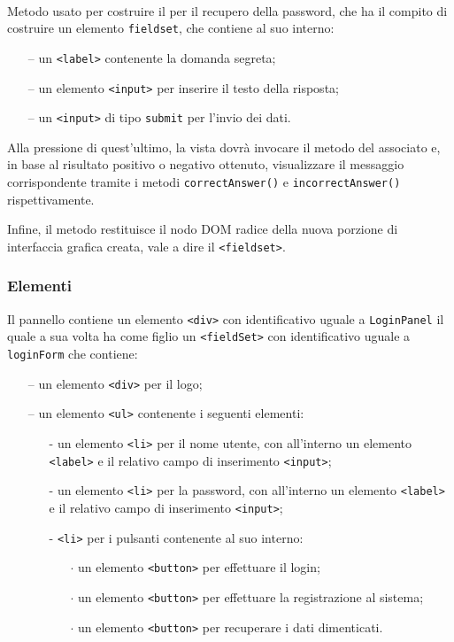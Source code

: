 \begin{description}
	\item{}\\
	Metodo usato per costruire il  per il recupero della password, che ha il compito di costruire un elemento \verb'fieldset', che contiene al suo interno:
	\begin{itemize}
	  \item[--] un \verb'<label>' contenente la domanda segreta;
	  \item[--] un elemento \verb'<input>' per inserire il testo della risposta;
	  \item[--] un \verb'<input>' di tipo \verb'submit' per l'invio dei dati.
	\end{itemize}
Alla pressione di quest'ultimo, la vista dovrà invocare il metodo  del  associato e, in base al risultato positivo o negativo ottenuto, visualizzare il messaggio corrispondente tramite i metodi \verb'correctAnswer()' e \verb'incorrectAnswer()' rispettivamente.

Infine, il metodo restituisce il nodo DOM radice della nuova porzione di interfaccia grafica creata, vale a dire il \verb'<fieldset>'.

\end{description}

\subsubsection*{Elementi}
Il pannello contiene un elemento \verb'<div>' con identificativo uguale a \verb'LoginPanel' il quale a sua volta ha come figlio un \verb'<fieldSet>' con identificativo uguale a \verb'loginForm' che contiene:
  \begin{itemize}
    \item[--] un elemento \verb'<div>' per il logo;
    \item[--] un elemento \verb'<ul>' contenente i seguenti elementi:
    \begin{itemize}
      \item[-] un elemento \verb'<li>' per il nome utente, con all'interno un elemento \verb'<label>' e il relativo campo di inserimento \verb'<input>';
      \item[-] un elemento \verb'<li>' per la password, con all'interno un elemento \verb'<label>' e il relativo campo di inserimento \verb'<input>';
      \item[-] \verb'<li>' per i pulsanti contenente al suo interno:
      \begin{itemize}
        \item[$\cdot$] un elemento \verb'<button>' per effettuare il login;
        \item[$\cdot$] un elemento \verb'<button>' per effettuare la registrazione al sistema;
        \item[$\cdot$] un elemento \verb'<button>' per recuperare i dati dimenticati.
      \end{itemize}
    \end{itemize}
  \end{itemize}
  

